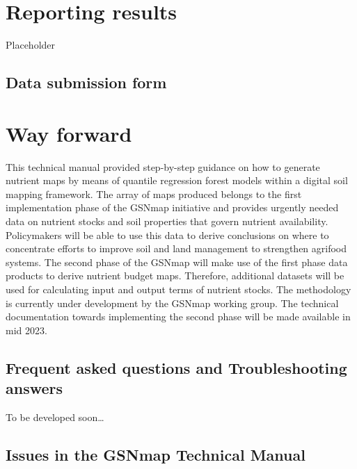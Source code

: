 \documentclass[
  10pt,
  b5paper,
  oneside]{book}
\begin{document}
\hypertarget{reporting-results}{%
\chapter{Reporting results}\label{reporting-results}}

Placeholder

\hypertarget{data-submission-form}{%
\section{Data submission form}\label{data-submission-form}}

\hypertarget{way-forward}{%
\chapter{Way forward}\label{way-forward}}

This technical manual provided step-by-step guidance on how to generate nutrient maps by means of quantile regression forest models within a digital soil mapping framework. The array of maps produced belongs to the first implementation phase of the GSNmap initiative and provides urgently needed data on nutrient stocks and soil properties that govern nutrient availability. Policymakers will be able to use this data to derive conclusions on where to concentrate efforts to improve soil and land management to strengthen agrifood systems.
The second phase of the GSNmap will make use of the first phase data products to derive nutrient budget maps. Therefore, additional datasets will be used for calculating input and output terms of nutrient stocks. The methodology is currently under development by the GSNmap working group. The technical documentation towards implementing the second phase will be made available in mid 2023.

\hypertarget{frequent-asked-questions-and-troubleshooting-answers}{%
\section{Frequent asked questions and Troubleshooting answers}\label{frequent-asked-questions-and-troubleshooting-answers}}

To be developed soon\ldots{}

\hypertarget{issues-in-the-gsnmap-technical-manual}{%
\section{Issues in the GSNmap Technical Manual}\label{issues-in-the-gsnmap-technical-manual}}
\end{document}
